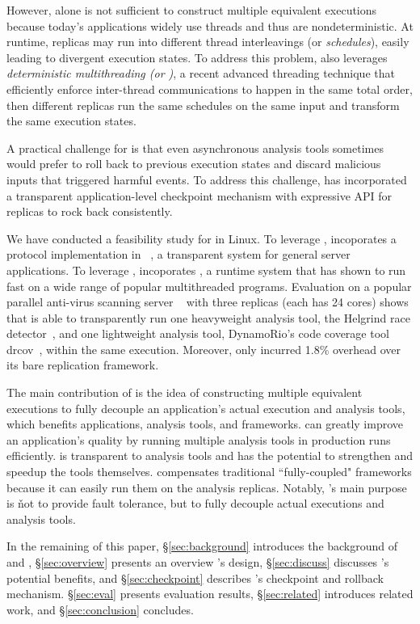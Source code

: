However, \smr alone is not sufficient to construct multiple equivalent 
executions because today's applications widely use threads and thus are 
nondeterministic. At runtime, replicas may run into different thread
interleavings (or \emph{schedules}), easily leading to divergent execution
states. To address this problem, \xxx also leverages \emph{deterministic
multithreading (or \dmt)}, a recent advanced threading technique that
efficiently enforce inter-thread communications to happen in the same total
order, then different replicas run the same schedules on the same input and
transform the same execution states.


A practical challenge for \xxx is that even asynchronous analysis tools
sometimes would prefer to roll back to previous execution states and discard 
malicious inputs that triggered harmful events. To address this challenge, \xxx 
has incorporated a transparent application-level checkpoint mechanism with 
expressive API for replicas to rock back consistently.


We have conducted a feasibility study for \xxx in Linux. To leverage \smr, \xxx 
incoporates a \paxos protocol implementation in \repbox~\cite{repbox:sosp15}, a 
transparent \smr system for general server applications. To leverage \dmt, \xxx 
incoporates \parrot, a \dmt runtime system that has shown to run fast on a wide 
range of popular multithreaded programs. Evaluation on a popular parallel 
anti-virus scanning server \clamav~\cite{clamav} with three replicas (each has 24 
cores) shows that \xxx is able to transparently run one heavyweight analysis 
tool, the Helgrind race detector~\cite{valgrind:pldi}, and one lightweight 
analysis tool, DynamoRio's code coverage tool drcov~\cite{dynamorio}, within 
the same execution. Moreover, \xxx only incurred 1.8\% overhead over its bare 
replication framework.


The main contribution of \xxx is the idea of constructing multiple equivalent
executions to fully decouple an application's actual execution and analysis
tools, which benefits applications, analysis tools, and frameworks. \xxx can
greatly improve an application's quality by running multiple analysis tools in
production runs efficiently. \xxx is transparent to analysis tools and has the
potential to strengthen and speedup the tools themselves. \xxx compensates 
traditional ``fully-coupled" frameworks because it can easily run them on the 
analysis replicas. Notably, \xxx's main purpose is \v{not} to provide fault 
tolerance, but to fully decouple actual executions and analysis tools.

In the remaining of this paper, \S\ref{sec:background} introduces the 
background of \smr and \dmt, \S\ref{sec:overview} presents an overview \xxx's 
design, \S\ref{sec:discuss} discusses \xxx's potential benefits, and 
\S\ref{sec:checkpoint} describes \xxx's checkpoint and rollback mechanism. 
\S\ref{sec:eval} presents evaluation results, \S\ref{sec:related} introduces 
related work, and \S\ref{sec:conclusion} concludes.